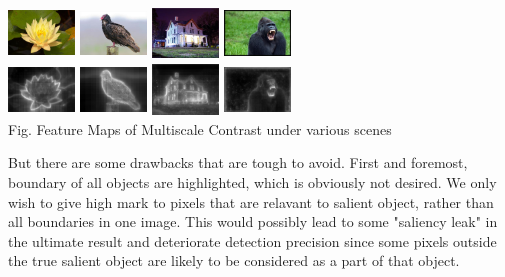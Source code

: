 \documentclass[10pt,twocolumn,letterpaper]{article}
\begin{document}
    \begin{center}
    \includegraphics[width=0.7in,height=0.54in]{./Figures/contrast/1orig.jpg}
    \includegraphics[width=0.7in,height=0.54in]{./Figures/contrast/2orig.jpg}
    \includegraphics[width=0.7in,height=0.54in]{./Figures/contrast/3orig.jpg}
    \includegraphics[width=0.7in,height=0.54in]{./Figures/contrast/4orig.jpg}\\
    \includegraphics[width=0.7in,height=0.54in]{./Figures/contrast/1cont.jpg}
    \includegraphics[width=0.7in,height=0.54in]{./Figures/contrast/2cont.jpg}
    \includegraphics[width=0.7in,height=0.54in]{./Figures/contrast/3cont.jpg}
    \includegraphics[width=0.7in,height=0.54in]{./Figures/contrast/4cont.jpg}\\
    \footnotesize Fig. Feature Maps of Multiscale Contrast under various scenes
    \end{center}

But there are some drawbacks that are tough to avoid. 
First and foremost, boundary of all objects are highlighted, which is obviously not desired.
We only wish to give high mark to pixels that are relavant to salient object, rather than all boundaries in one image. 
This would possibly lead to some "saliency leak" in the ultimate result and deteriorate detection precision
 since some pixels outside the true salient object are likely to be considered as a part of that object.
\end{document}
